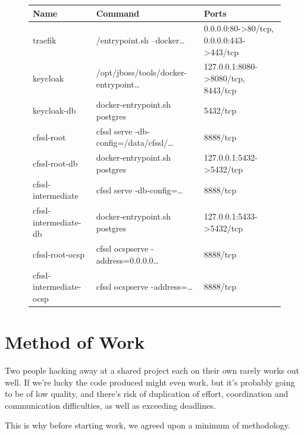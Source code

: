 \begin{figure}
    \begin{center}
        \begin{tabular}{p{3.4cm}|p{5.7cm}|p{6.2cm}}
            \textbf{Name} & \textbf{Command} & \textbf{Ports} \\
            \hline
            traefik & /entrypoint.sh --docker\ldots & 0.0.0.0:80->80/tcp, 0.0.0.0:443->443/tcp \\*
            \hline
            keycloak & /opt/jboss/tools/docker-entrypoint\ldots & 127.0.0.1:8080->8080/tcp, 8443/tcp \\*
            \hline
            keycloak-db & docker-entrypoint.sh postgres & 5432/tcp \\*
            \hline
            cfssl-root & cfssl serve -db-config=/data/cfssl/\ldots & 8888/tcp \\*
            \hline
            cfssl-root-db & docker-entrypoint.sh postgres & 127.0.0.1:5432->5432/tcp \\*
            \hline
            cfssl-intermediate & cfssl serve -db-config=\ldots & 8888/tcp \\*
            \hline
            cfssl-intermediate-db & docker-entrypoint.sh postgres & 127.0.0.1:5433->5432/tcp \\*
            \hline
            cfssl-root-ocsp & cfssl ocspserve -address=0.0.0.0\ldots & 8888/tcp \\*
            \hline
            cfssl-intermediate-ocsp & cfssl ocspserve -address=\ldots & 8888/tcp \\*
        \end{tabular}
    \end{center}
\end{figure}

\section{Method of Work}\label{sec:method-of-work}
Two people hacking away at a shared project each on their own rarely works out well.
If we're lucky the code produced might even work, but it's probably going to be of low quality,
and there's risk of duplication of effort,
coordination and communication difficulties,
as well as exceeding deadlines.

This is why before starting work, we agreed upon a minimum of methodology.

